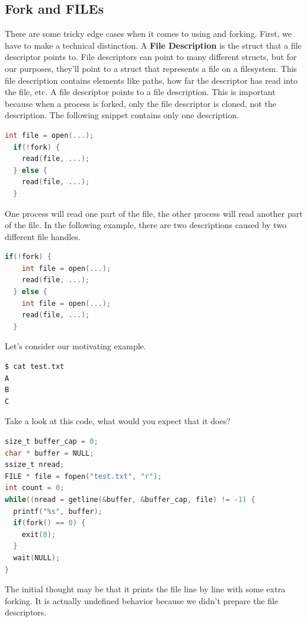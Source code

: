 \subsection{Fork and FILEs}

There are some tricky edge cases when it comes to using  and forking.
First, we have to make a technical distinction.
A \textbf{File Description} is the struct that a file descriptor points to.
File descriptors can point to many different structs, but for our purposes, they'll point to a struct that represents a file on a filesystem.
This file description contains elements like paths, how far the descriptor has read into the file, etc.
A file descriptor points to a file description.
This is important because when a process is forked, only the file descriptor is cloned, not the description.
The following snippet contains only one description.

\begin{lstlisting}[language=C]
  int file = open(...);
  if(!fork) {
    read(file, ...);
  } else {
    read(file, ...);
  }
\end{lstlisting}

One process will read one part of the file, the other process will read another part of the file.
In the following example, there are two descriptions caused by two different file handles.

\begin{lstlisting}[language=C]
  if(!fork) {
    int file = open(...);
    read(file, ...);
  } else {
    int file = open(...);
    read(file, ...);
  }
\end{lstlisting}

Let's consider our motivating example.

\begin{lstlisting}[language=bash]
$ cat test.txt
A
B
C
\end{lstlisting}

Take a look at this code, what would you expect that it does?

\begin{lstlisting}[language=C]
size_t buffer_cap = 0;
char * buffer = NULL;
ssize_t nread;
FILE * file = fopen("test.txt", "r");
int count = 0;
while((nread = getline(&buffer, &buffer_cap, file) != -1) {
  printf("%s", buffer);
  if(fork() == 0) { 
    exit(0);
  }
  wait(NULL);
}
\end{lstlisting}

The initial thought may be that it prints the file line by line with some extra forking.
It is actually undefined behavior because we didn't prepare the file descriptors.

